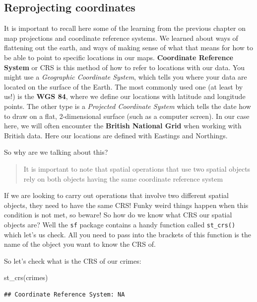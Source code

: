 \documentclass[
]{book}
\newenvironment{Shaded}{\begin{snugshade}}{\end{snugshade}}
\newcommand{\FunctionTok}[1]{\textcolor[rgb]{0.00,0.00,0.00}{#1}}
\newcommand{\NormalTok}[1]{#1}
\begin{document}
\hypertarget{reprojecting-coordinates}{%
\subsection{Reprojecting coordinates}\label{reprojecting-coordinates}}

It is important to recall here some of the learning from the previous chapter on map projections and coordinate reference systems. We learned about ways of flattening out the earth, and ways of making sense of what that means for how to be able to point to specific locations in our maps. \textbf{Coordinate Reference System} or CRS is this method of how to refer to locations with our data. You might use a \emph{Geographic Coordinate System}, which tells you where your data are located on the surface of the Earth. The most commonly used one (at least by us!) is the \textbf{WGS 84}, where we define our locations with latitude and longitude points. The other type is a \emph{Projected Coordinate System} which tells the date how to draw on a flat, 2-dimensional surface (such as a computer screen). In our case here, we will often encounter the \textbf{British National Grid} when working with British data. Here our locations are defined with Eastings and Northings.

So why are we talking about this?

\begin{quote}
It is important to note that spatial operations that use two spatial objects rely on both objects having the same coordinate reference system
\end{quote}

If we are looking to carry out operations that involve two different spatial objects, they need to have the same CRS! Funky weird things happen when this condition is not met, so beware! So how do we know what CRS our spatial objects are? Well the \texttt{sf} package contains a handy function called \texttt{st\_crs()} which let's us check. All you need to pass into the brackets of this function is the name of the object you want to know the CRS of.

So let's check what is the CRS of our crimes:

\begin{Shaded}
\begin{Highlighting}[]
\FunctionTok{st\_crs}\NormalTok{(crimes)}
\end{Highlighting}
\end{Shaded}

\begin{verbatim}
## Coordinate Reference System: NA
\end{verbatim}
\end{document}
